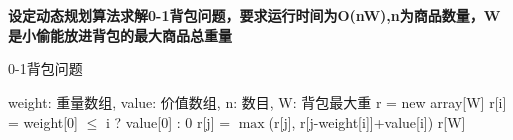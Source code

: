 \documentclass[UTF8]{article}
\begin{document}
\newpage
\section{}
\textbf{设定动态规划算法求解0-1背包问题，要求运行时间为O(nW),n为商品数量，W是小偷能放进背包的最大商品总重量}\\
\begin{minipage}{\linewidth*6/7}
	\begin{algorithm}[H]
		\caption{0-1背包问题}
		\begin{algorithmic}[1] %
		\Require weight: 重量数组, value: 价值数组, n: 数目, W: 背包最大重
			\State r = new array[W] 
			 
				\State r[i] = weight[0] $\le$ i ? value[0] : 0 
			\EndFor
			 
				 
					\State r[j] = $\max$(r[j], r[j-weight[i]]+value[i]) 
				\EndFor
			\EndFor
			\Return r[W] 
		\EndFunction
		\end{algorithmic}
	\end{algorithm}
\end{minipage}
\end{document}
